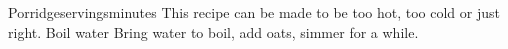 \begin{recipe}{Porridge}{\unit[4]{servings}}{\unit[45]{minutes}}
\freeform This recipe can be made to be too hot, too cold or just right.
\newstep Boil water
Bring water to boil, add oats, simmer for a while.
\end{recipe}

